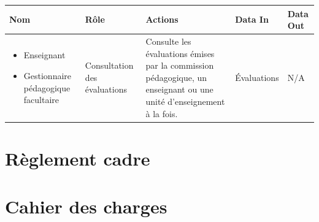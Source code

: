 \documentclass[a4paper,11pt]{report}
\begin{document}
\begin{tabularx}{\linewidth}{|X|X|X|X|X|} \hline
Nom & Rôle & Actions & Data In & Data Out \\ \hline 
\begin{itemize}
	\item Enseignant
	\item Gestionnaire pédagogique facultaire
\end{itemize}
& Consultation des évaluations & Consulte les évaluations émises par la commission pédagogique, un enseignant ou une unité d'enseignement à la fois. & Évaluations & N/A \\ \hline
\end{tabularx}




\appendix
\renewcommand{\partname}{Annexe}
\setcounter{part}{0}%
\part{Règlement cadre}\label{an:regl-cadre}


\part{Cahier des charges}

\end{document}
